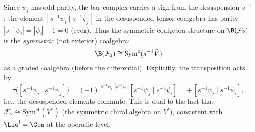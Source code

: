 \begin{computation}
\label{comp:fermion-deg2-signs}
Since $\psi_i$ has odd parity, the bar complex carries a
sign from the desuspension $s^{-1}$:
the element $[s^{-1}\psi_i \mid s^{-1}\psi_j]$ in the
desuspended tensor coalgebra has parity $|s^{-1}\psi_i| = |\psi_i| - 1 = 0$
(even). Thus the symmetric coalgebra structure on $\B(\mathcal{F}_2)$
is the \emph{symmetric} (not exterior) coalgebra:
\[
\B(\mathcal{F}_2) \cong \mathrm{Sym}^c(s^{-1}\bar{V})
\]
as a graded coalgebra (before the differential).
Explicitly, the transposition acts by
\[
\tau\bigl([s^{-1}\psi_i \mid s^{-1}\psi_j]\bigr)
= (-1)^{|s^{-1}\psi_i|\,|s^{-1}\psi_j|}
 [s^{-1}\psi_j \mid s^{-1}\psi_i]
= +\,[s^{-1}\psi_j \mid s^{-1}\psi_i],
\]
i.e., the desuspended elements commute. This is dual to the
fact that $\mathcal{F}_2^! \cong \mathrm{Sym}^{\mathrm{ch}}(V^*)$
(the symmetric chiral algebra on $V^*$), consistent with
$\Lie^! = \Com$ at the operadic level.
\end{computation}

